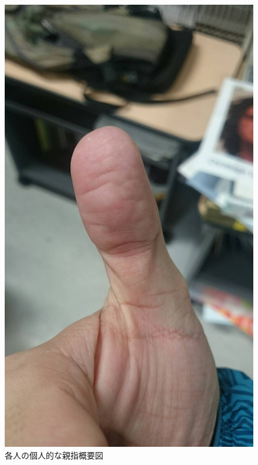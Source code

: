 \documentclass[12pt]{jsarticle}
\begin{document}
\begin{figure}[htbp]
\begin{minipage}{0.4\linewidth}
    \includegraphics[scale=0.15]{figure/takeda}
  \end{minipage}
  \caption{各人の個人的な親指概要図}
 \end{figure}
\end{document}
